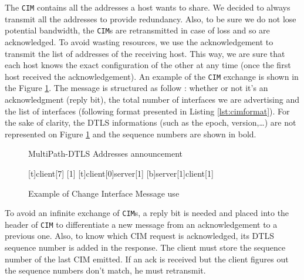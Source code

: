 The \verb!CIM! contains all the addresses a host wants to share. We decided to always transmit all the addresses to provide redundancy. Also, to be sure we do not lose potential bandwidth, the \verb!CIM!s are retransmitted in case of loss and so are acknowledged. To avoid wasting resources, we use the acknowledgement to transmit the list of addresses of the receiving host. This way, we are sure that each host knows the exact configuration of the other at any time (once the first host received the acknowledgement). An example of the \verb!CIM! exchange is shown in the Figure \ref{fig:CIMexchange}. The message is structured as follow : whether or not it's an acknowledgment (reply bit), the total number of interfaces we are advertising and the list of interfaces (following format presented in Listing \ref{lst:cimformat}). For the sake of clarity, the DTLS informations (such as the epoch, version,\dots) are not represented on Figure \ref{fig:CIMexchange} and the sequence numbers are shown in bold.

\begin{figure}[!h]
\centering
\begin{msc}[r]{MultiPath-DTLS Addresses announcement}

\setlength{\instfootheight}{0em}
\setlength{\instheadheight}{0em}
\setlength{\instdist}{0.7\linewidth}
\setlength{\levelheight}{3em}


[t]{}{client}[7]
[1]
\nextlevel
{}[t]{client}[0]{server}[1]
\nextlevel
{}[b]{server}[1]{client}[1]
\nextlevel
\nextlevel

\end{msc}
\caption{Example of Change Interface Message use}
\label{fig:CIMexchange}
\end{figure}

To avoid an infinite exchange of \verb!CIM!s, a reply bit is needed and placed into the header of \verb!CIM! to differentiate a new message from an acknowledgement to a previous one. Also, to know which CIM request is acknowledged, its DTLS sequence number is added in the response. The client must store the sequence number of the last CIM emitted. If an ack is received but the client figures out the sequence numbers don't match, he must retransmit.

